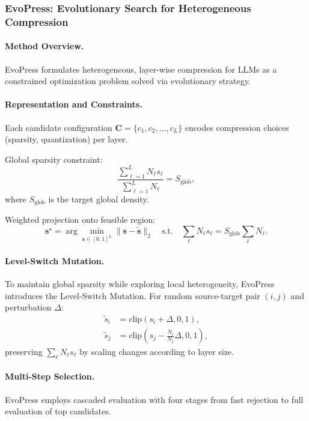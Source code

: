 \subsubsection{EvoPress: Evolutionary Search for Heterogeneous Compression}

\paragraph{Method Overview.} EvoPress formulates heterogeneous, layer-wise compression for LLMs as a constrained optimization problem solved via evolutionary strategy.

\paragraph{Representation and Constraints.}
Each candidate configuration $\mathbf{C} = \{c_1, c_2, \dots, c_L\}$ encodes compression choices (sparsity, quantization) per layer.

Global sparsity constraint:
\begin{equation}
	\frac{\sum_{\ell=1}^L N_\ell s_\ell}{\sum_{\ell=1}^L N_\ell} = S_{\text{glob}},
\end{equation}
where $S_{\text{glob}}$ is the target global density.

Weighted projection onto feasible region:
\begin{equation}
	\mathbf{s}^\star = \arg\min_{\mathbf{s}\in[0,1]^L} \|\mathbf{s}-\tilde{\mathbf{s}}\|_2 \quad 
	\text{s.t.} \quad \sum_\ell N_\ell s_\ell = S_{\text{glob}}\sum_\ell N_\ell.
\end{equation}

\paragraph{Level-Switch Mutation.}
To maintain global sparsity while exploring local heterogeneity, EvoPress introduces the Level-Switch Mutation. For random source-target pair $(i,j)$ and perturbation $\Delta$:
\begin{align}
	\tilde{s}_i &= \text{clip}(s_i + \Delta, 0, 1), \\
	\tilde{s}_j &= \text{clip}\left(s_j - \frac{N_i}{N_j}\Delta, 0, 1\right),
\end{align}
preserving $\sum_\ell N_\ell s_\ell$ by scaling changes according to layer size.

\paragraph{Multi-Step Selection.}
EvoPress employs cascaded evaluation with four stages from fast rejection to full evaluation of top candidates.

